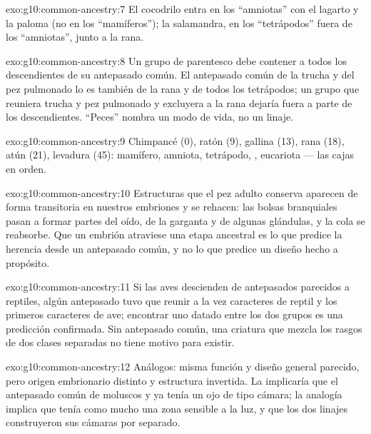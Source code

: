 \begin{solution}{exo:g10:common-ancestry:7}
El cocodrilo entra en los ``amniotas'' con el lagarto y la paloma (no
en los ``mamíferos''); la salamandra, en los ``tetrápodos'' fuera de
los ``amniotas'', junto a la rana.
\end{solution}

\begin{solution}{exo:g10:common-ancestry:8}
Un grupo de parentesco debe contener a todos los descendientes de su
antepasado común. El antepasado común de la trucha y del pez pulmonado
lo es también de la rana y de todos los tetrápodos; un grupo que
reuniera trucha y pez pulmonado y excluyera a la rana dejaría fuera a
parte de los descendientes. ``Peces'' nombra un modo de vida, no un
linaje.
\end{solution}

\begin{solution}{exo:g10:common-ancestry:9}
Chimpancé (0), ratón (9), gallina (13), rana (18), atún (21), levadura
(45): mamífero, amniota, tetrápodo, , eucariota --- las cajas
en orden.
\end{solution}

\begin{solution}{exo:g10:common-ancestry:10}
Estructuras que el pez adulto conserva aparecen de forma transitoria en
nuestros embriones y se rehacen: las bolsas branquiales pasan a formar
partes del oído, de la garganta y de algunas glándulas, y la cola se
reabsorbe. Que un embrión atraviese una etapa ancestral es lo que
predice la herencia desde un antepasado común, y no lo que predice un
diseño hecho a propósito.
\end{solution}

\begin{solution}{exo:g10:common-ancestry:11}
Si las aves descienden de antepasados parecidos a reptiles, algún
antepasado tuvo que reunir a la vez caracteres de reptil y los primeros
caracteres de ave; encontrar uno datado entre los dos grupos es una
predicción confirmada. Sin antepasado común, una criatura que mezcla
los rasgos de dos clases separadas no tiene motivo para existir.
\end{solution}

\begin{solution}{exo:g10:common-ancestry:12}
Análogos: misma función y diseño general parecido, pero origen
embrionario distinto y estructura invertida. La  implicaría
que el antepasado común de moluscos y  ya tenía un ojo de
tipo cámara; la analogía implica que tenía como mucho una zona sensible
a la luz, y que los dos linajes construyeron sus cámaras por separado.
\end{solution}


